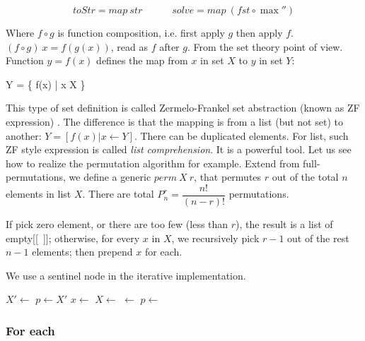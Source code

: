 \documentclass[b5paper]{article}
\begin{document}
\[
\textstyle
toStr = map\ str \quad \quad \quad
solve = map\ (fst \circ \max'')
\]

Where $f \circ g$ is function composition, i.e. first apply $g$ then apply $f$. $(f \circ g)\ x = f(g(x))$, read as $f$ after $g$. From the set theory point of view. Function $y = f(x)$ defines the map from $x$ in set $X$ to $y$ in set $Y$:

\be
Y = \{ f(x) | x \in X \}
\ee

 
This type of set definition is called Zermelo-Frankel set abstraction (known as ZF expression) \cite{algo-fp}. The difference is that the mapping is from a list (but not set) to another: $Y = [f(x) | x \gets Y]$. There can be duplicated elements. For list, such ZF style expression is called {\em list comprehension}. It is a powerful tool. Let us see how to realize the permutation algorithm for example. Extend from full-permutations\cite{algo-fp}\cite{erlang}, we define a generic $perm\ X\ r$, that permutes $r$ out of the total $n$ elements in list $X$. There are total $P_n^r = \dfrac{n!}{(n-r)!}$ permutations.

\be
{}
\ee

If pick zero element, or there are too few (less than $r$), the result is a list of empty[[\ ]]; otherwise, for every $x$ in $X$, we recursively pick $r-1$ out of the rest $n-1$ elements; then prepend $x$ for each.

We use a sentinel node in the iterative  implementation.

\begin{algorithmic}[1]
  \State $X' \gets$  
  \State $p \gets X'$
    \State $x \gets$ 
    \State $X \gets$ 
    \State {} $\gets$ 
    \State $p \gets$ 
  \EndWhile
  \State \Return {} 
\EndFunction
\end{algorithmic}

\subsubsection{For each}
\end{document}
